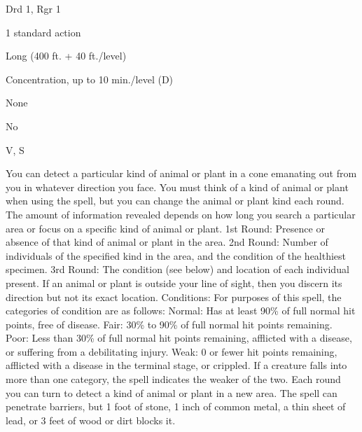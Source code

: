 
\begin{description*}
\item[Level:] Drd 1, Rgr 1
\item[Casting Time:] 1 standard action
\item[Range:] Long (400 ft. + 40 ft./level)
\item[Duration:] Concentration, up to 10 min./level (D)
\item[Saving Throw:] None
\item[Spell Resistance:] No
\item[Components:] V, S
\end{description*}

You can detect a particular kind of animal or plant in a cone emanating out from
you in whatever direction you face. You must think of a kind of animal or plant
when using the spell, but you can change the animal or plant kind each round. The
amount of information revealed depends on how long you search a particular area
or focus on a specific kind of animal or plant.
1st Round: Presence or absence of that kind of animal or plant in the
area.
2nd Round: Number of individuals of the specified kind in the area, and
the condition of the healthiest specimen.
3rd Round: The condition (see below) and location of each individual present.
If an animal or plant is outside your line of sight, then you discern its direction
but not its exact location.
Conditions: For purposes of this spell, the categories of condition are
as follows:
Normal: Has at least 90\% of full normal hit points, free of disease.
Fair: 30\% to 90\% of full normal hit points remaining.
Poor: Less than 30\% of full normal hit points remaining, afflicted with a disease,
or suffering from a debilitating injury.
Weak: 0 or fewer hit points remaining, afflicted with a disease in the terminal
stage, or crippled.
If a creature falls into more than one category, the spell indicates the weaker
of the two.
Each round you can turn to detect a kind of animal or plant in a new area. The
spell can penetrate barriers, but 1 foot of stone, 1 inch of common metal, a thin
sheet of lead, or 3 feet of wood or dirt blocks it.